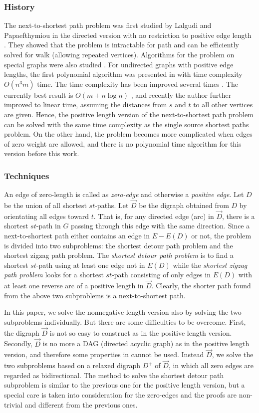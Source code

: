 \documentclass[review]{elsarticle}
\newcommand{\diD}{\vec{D}}
\begin{document}
\subsubsection*{History}
The next-to-shortest path problem was first studied by Lalgudi and
Papaefthymiou in the directed version with no restriction to
positive edge length \cite{lal97}. They showed that the problem is
intractable for path and can be efficiently solved for walk
(allowing repeated vertices). Algorithms for the problem on special
graphs were also studied \cite{bar07,mod06}. For undirected graphs
with positive edge lengths, the first polynomial algorithm was
presented in \cite{kra04} with time complexity $O(n^3m)$ time. The
time complexity has been improved several times
\cite{li06,kao11,wu10}. The currently best result is $O(m+n\log n)$
\cite{wu10}, and recently the author further improved to linear
time, assuming the distances from $s$ and $t$ to all other vertices
are given. Hence, the positive length version of the
next-to-shortest path problem can be solved with the same time
complexity as the single source shortest paths problem. On the other
hand, the problem becomes more complicated when edges of zero weight
are allowed, and there is no polynomial time algorithm for this
version before this work.

\subsubsection*{Techniques}
An edge of zero-length is called as \emph{zero-edge} and otherwise a
\emph{positive edge}. Let $D$ be the union of all shortest
$st$-paths. Let $\diD$ be the digraph obtained from $D$ by
orientating all edges toward $t$. That is, for any directed edge
(arc) in $\diD$, there is a shortest $st$-path in $G$ passing
through this edge with the same direction. Since a next-to-shortest
path either contains an edge in $E-E(D)$ or not, the problem is
divided into two subproblems: the shortest detour path problem and
the shortest zigzag path problem. The {\em shortest detour path
problem} is to find a shortest $st$-path using at least one edge not
in $E(D)$ while the {\em shortest zigzag path problem} looks for a
shortest $st$-path consisting of only edges in $E(D)$ with at least
one reverse arc of a positive length in $\diD$. Clearly, the shorter
path found from the above two subproblems is a next-to-shortest
path.

In this paper, we solve the nonnegative length version also by
solving the two subproblems individually. But there are some
difficulties to be overcome. First, the digraph $\diD$ is not so
easy to construct as in the positive length version. Secondly,
$\diD$ is no more a DAG (directed acyclic graph) as in the positive
length version, and therefore some properties in \cite{wu10} cannot
be used. Instead $\diD$, we solve the two subproblems based on a
relaxed digraph $D^+$ of $\diD$, in which all zero edges are
regarded as bidirectional. The method to solve the shortest detour
path subproblem is similar to the previous one for the positive
length version, but a special care is taken into consideration for
the zero-edges and the proofs are non-trivial and different from the previous ones.
\end{document}
